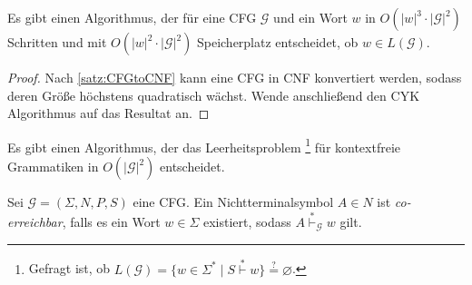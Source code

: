 \begin{Korollar}
	Es gibt einen Algorithmus, der für eine \ac{CFG} $\mathcal{G}$ und ein Wort $w$
	in $O(|w|^3\cdot |\mathcal{G}|^2)$ Schritten und mit $O(|w|^2\cdot |\mathcal{G}|^2)$ Speicherplatz
	entscheidet, ob $w\in L(\mathcal{G})$.
\end{Korollar}

\begin{proof}
	Nach \autoref{satz:CFGtoCNF} kann eine \ac{CFG} in \ac{CNF} 
	konvertiert werden, sodass deren Größe höchstens quadratisch wächst.
	Wende anschließend den CYK Algorithmus auf das Resultat an.
\end{proof}



\begin{Satz}\label{thm:cfl-decidable-emptyness}
    Es gibt einen Algorithmus, der das Leerheitsproblem%
    \footnote{Gefragt ist, ob $L(\mathcal{G}) = \{ w\in\Sigma^* \mid S\overset{*}{\vdash} w \} \overset{?}{=} \varnothing$.}
    für kontextfreie Grammatiken in $O(|\mathcal{G}|^2)$ entscheidet.
\end{Satz}

\begin{Def}
	Sei $\mathcal{G} = (\Sigma, N, P, S)$ eine \ac{CFG}. 
	Ein Nichtterminalsymbol $A\in N$ ist \emph{co-erreichbar}, falls es ein Wort $w\in\Sigma$ existiert, 
	sodass $A \stackrel{*}{\vdash}_\mathcal{G} w$ gilt.
\end{Def}


